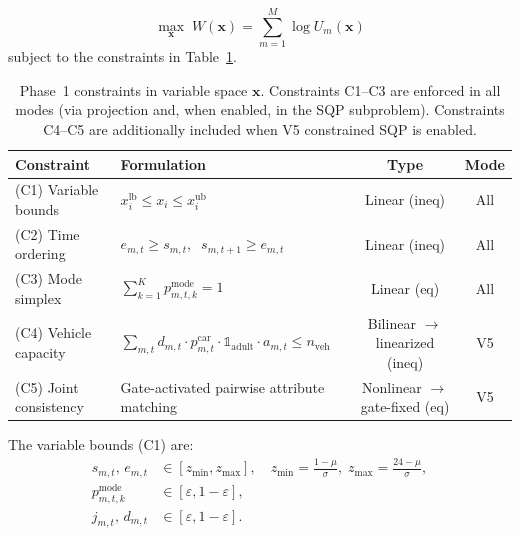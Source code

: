 \documentclass[11pt,a4paper]{article}
\newcommand{\indicator}{\mathbb{1}}
\begin{document}
\begin{equation}
    \max_{\mathbf{x}} \; W(\mathbf{x}) = \sum_{m=1}^{M} \log U_m(\mathbf{x})
    \label{eq:nlp_obj}
\end{equation}
subject to the constraints in Table~\ref{tab:phase1_constraints}.

\begin{table}[ht]
\centering
\caption{Phase~1 constraints in variable space $\mathbf{x}$.
Constraints C1--C3 are enforced in all modes (via projection and, when enabled, in the SQP subproblem).
Constraints C4--C5 are additionally included when V5 constrained SQP is enabled.}
\label{tab:phase1_constraints}
\begin{tabular}{@{}llcc@{}}
\toprule
Constraint & Formulation & Type & Mode \\
\midrule
(C1) Variable bounds &
    $x_i^{\mathrm{lb}} \leq x_i \leq x_i^{\mathrm{ub}}$ & Linear (ineq) & All \\[4pt]
(C2) Time ordering &
    $e_{m,t} \geq s_{m,t}, \;\; s_{m,t+1} \geq e_{m,t}$ & Linear (ineq) & All \\[4pt]
(C3) Mode simplex &
    $\sum_{k=1}^{K} p^{\mathrm{mode}}_{m,t,k} = 1$ & Linear (eq) & All \\[4pt]
(C4) Vehicle capacity &
    $\sum_{m,t} d_{m,t} \cdot p^{\mathrm{car}}_{m,t} \cdot \indicator_{\mathrm{adult}} \cdot a_{m,t} \leq n_{\mathrm{veh}}$ & Bilinear $\to$ linearized (ineq) & V5 \\[4pt]
(C5) Joint consistency &
    Gate-activated pairwise attribute matching & Nonlinear $\to$ gate-fixed (eq) & V5 \\
\bottomrule
\end{tabular}
\end{table}

The variable bounds (C1) are:
\begin{align}
    s_{m,t},\, e_{m,t} &\in [z_{\min}, z_{\max}], \quad z_{\min} = \frac{1 - \mu}{\sigma},\; z_{\max} = \frac{24 - \mu}{\sigma}, \\
    p^{\mathrm{mode}}_{m,t,k} &\in [\varepsilon, 1 - \varepsilon], \\
    j_{m,t},\, d_{m,t} &\in [\varepsilon, 1 - \varepsilon].
\end{align}
\end{document}
